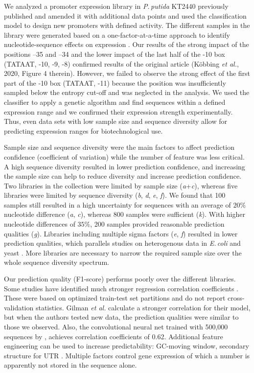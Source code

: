 \documentclass[utf8]{frontiersSCNS} %
\begin{document}
We analyzed a promoter expression library in \textit{P.\,putida} KT2440 previously published \citep{Kobbing2020} and amended it with additional data points and used the classification model to design new promoters with defined activity. The different samples in the library were generated based on a one-factor-at-a-time approach to identify nucleotide-sequence effects on expression \citep{Czitrom1999}. Our results of the strong impact of the positions –35 and –34 and the lower impact of the last half of the -10 box (TATAAT, -10, -9, -8) confirmed results of the original article (Köbbing \textit{et al.}, 2020, Figure 4 therein). However, we failed to observe the strong effect of the first part of the -10 box (TATAAT, -11) because the position was insufficiently sampled below the entropy cut-off and was neglected in the analysis. We used the classifier to apply a genetic algorithm and find sequences within a defined expression range and we confirmed their expression strength experimentally. Thus, even data sets with low sample size and sequence diversity allow for predicting expression ranges for biotechnological use.

Sample size and sequence diversity were the main factors to affect prediction confidence (coefficient of variation) while the number of feature was less critical. A high sequence diversity resulted in lower prediction confidence, and increasing the sample size can help to reduce diversity and increase prediction confidence. Two libraries in the collection were limited by sample size (\textit{a}+\textit{c}), whereas five libraries were limited by sequence diversity (\textit{b}, \textit{d}, \textit{e}, \textit{f}). We found that 100 samples still resulted in a high uncertainty for sequences with an average of $20\%$ nucleotide difference (\textit{a}, \textit{c}), whereas 800 samples were sufficient (\textit{k}). With higher nucleotide differences of $35\%$, 200 samples provided reasonable prediction qualities (\textit{g}). Libraries including multiple sigma factors (\textit{e}, \textit{f})\citep{Gilman2019} resulted in lower prediction qualities, which parallels studies on heterogenous data in \textit{E.\,coli} \citep{Cambray2018} and yeast \citep{Liya2021}. More libraries are necessary to narrow the required sample size over the whole sequence diversity spectrum.  

Our prediction quality (F1-score) performs poorly over the different libraries. Some studies have identified much stronger regression correlation coefficients \citep{Rhodius2010,Meng2013,Meng2017}. These were based on optimized train-test set partitions and do not report cross-validation statistics. Gilman \textit{et al.} calculate a stronger correlation for their model, but when the authors tested new data, the prediction qualities were similar to those we observed. Also, the convolutional neural net trained with 500,000 sequences by \cite{Cuperus2017}, achieves correlation coefficients of 0.62. Additional feature engineering can be used to increase predictability: GC-moving window, secondary structure for UTR \citep{Cuperus2017}. Multiple factors control gene expression of which a number is apparently not stored in the sequence alone.  
\end{document}
